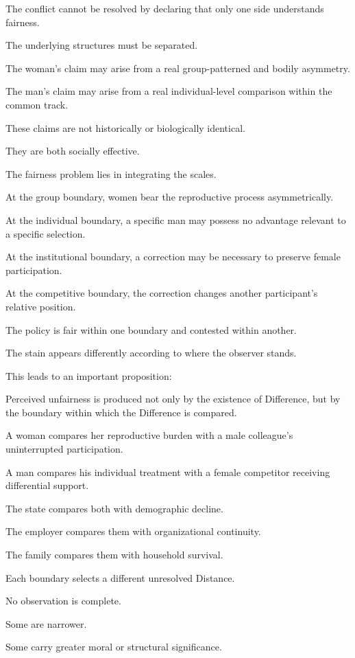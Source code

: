 The conflict cannot be resolved by declaring that only one side understands fairness.

The underlying structures must be separated.

The woman’s claim may arise from a real group-patterned and bodily asymmetry.

The man’s claim may arise from a real individual-level comparison within the common track.

These claims are not historically or biologically identical.

They are both socially effective.

The fairness problem lies in integrating the scales.

At the group boundary, women bear the reproductive process asymmetrically.

At the individual boundary, a specific man may possess no advantage relevant to a specific selection.

At the institutional boundary, a correction may be necessary to preserve female participation.

At the competitive boundary, the correction changes another participant’s relative position.

The policy is fair within one boundary and contested within another.

The stain appears differently according to where the observer stands.

This leads to an important proposition:

Perceived unfairness is produced not only by the existence of Difference, but by the boundary within which the Difference is compared.

A woman compares her reproductive burden with a male colleague’s uninterrupted participation.

A man compares his individual treatment with a female competitor receiving differential support.

The state compares both with demographic decline.

The employer compares them with organizational continuity.

The family compares them with household survival.

Each boundary selects a different unresolved Distance.

No observation is complete.

Some are narrower.

Some carry greater moral or structural significance.


